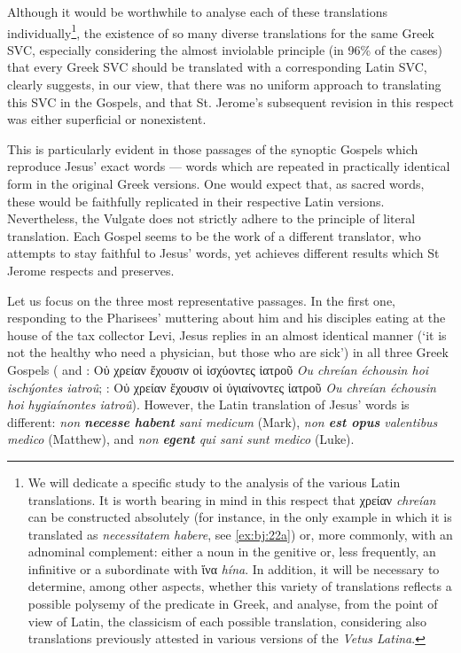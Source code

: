 \documentclass[output=paper,colorlinks,citecolor=brown]{langscibook}
\begin{document}
Although it would be worthwhile to analyse each of these translations individually\footnote{We will dedicate a specific study to the analysis of the various Latin
  translations. It is worth bearing in mind in this respect that χρείαν \emph{chreían}
  can be constructed absolutely (for instance, in the only example in which it is
  translated as \emph{necessitatem habere}, see \ref{ex:bj:22a}) or, more commonly, with an
  adnominal complement: either a noun in the genitive or, less frequently, an infinitive
  or a subordinate with ἵνα \emph{hína}. In addition, it will be necessary to determine,
  among other aspects, whether this variety of translations reflects a possible polysemy
  of the predicate in Greek, and analyse, from the point of view of Latin, the classicism
  of each possible translation, considering also translations previously attested in
  various versions of the \textit{Vetus Latina}.}, the existence of so many diverse translations for
the same Greek SVC, especially considering the almost inviolable principle (in 96\% of the
cases) that every Greek SVC should be translated with a corresponding Latin SVC, clearly
suggests, in our view, that there was no uniform approach to translating this SVC in the
Gospels, and that St. Jerome's subsequent revision in this respect was either superficial
or nonexistent.


This is particularly evident in those passages of the synoptic Gospels which reproduce
Jesus' exact words --- words which are repeated in practically identical form in the
original Greek versions. One would expect that, as sacred words, these would be faithfully
replicated in their respective Latin versions. Nevertheless, the Vulgate does not strictly
adhere to the principle of literal translation. Each Gospel seems to be the work of a
different translator, who attempts to stay faithful to Jesus' words, yet achieves
different results which St Jerome respects and preserves.


Let us focus on the three most representative passages. In the first one, responding to
the Pharisees' muttering about him and his disciples eating at the house of the tax
collector Levi, Jesus replies in an almost identical manner (`it is not the healthy who
need a physician, but those who are sick') in all three Greek Gospels ( and : Οὐ χρείαν ἔχουσιν οἱ ἰσχύοντες ἰατροῦ \emph{Ou chreían échousin hoi ischýontes
  iatroû}; : Οὐ χρείαν ἔχουσιν οἱ ὑγιαίνοντες ἰατροῦ \emph{Ou chreían échousin
  hoi hygiaínontes iatroû}). However, the Latin translation of Jesus' words is different:
\emph{non \textbf{necesse habent} sani medicum} (Mark), \emph{non \textbf{est opus}
  valentibus medico} (Matthew), and \emph{non \textbf{egent} qui sani sunt medico} (Luke).
\end{document}
